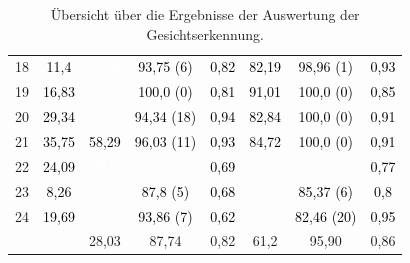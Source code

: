 \begin{table}[]
\begin{tabular}{c | c | c  c c | c c c}
18 & \cellcolor[HTML]{E2E2E2}\textcolor{black}{11,4} & \cellcolor[HTML]{BA4500}\textcolor{white}{27,08} & \cellcolor[HTML]{0FF000}\textcolor{black}{93,75 (6)} & \cellcolor[HTML]{2ED100}\textcolor{black}{0,82}& \cellcolor[HTML]{2DD200}\textcolor{black}{82,19} & \cellcolor[HTML]{01FD00}\textcolor{black}{98,96 (1)} & \cellcolor[HTML]{10EE00}\textcolor{black}{0,93} \\
19 & \cellcolor[HTML]{D3D3D3}\textcolor{black}{16,83} & \cellcolor[HTML]{916E00}\textcolor{white}{43,21} & \cellcolor[HTML]{00FF00}\textcolor{black}{100,0 (0)} & \cellcolor[HTML]{30CF00}\textcolor{black}{0,81}& \cellcolor[HTML]{17E800}\textcolor{black}{91,01} & \cellcolor[HTML]{00FF00}\textcolor{black}{100,0 (0)} & \cellcolor[HTML]{26D900}\textcolor{black}{0,85} \\
20 & \cellcolor[HTML]{B3B3B3}\textcolor{black}{29,34} & \cellcolor[HTML]{8C7300}\textcolor{white}{45,11} & \cellcolor[HTML]{0EF100}\textcolor{black}{94,34 (18)} & \cellcolor[HTML]{0FF000}\textcolor{black}{0,94}& \cellcolor[HTML]{2BD300}\textcolor{black}{82,84} & \cellcolor[HTML]{00FF00}\textcolor{black}{100,0 (0)} & \cellcolor[HTML]{17E800}\textcolor{black}{0,91} \\
21 & \cellcolor[HTML]{A3A3A3}\textcolor{black}{35,75} & \cellcolor[HTML]{699500}\textcolor{black}{58,29} & \cellcolor[HTML]{09F500}\textcolor{black}{96,03 (11)} & \cellcolor[HTML]{10EE00}\textcolor{black}{0,93}& \cellcolor[HTML]{27D800}\textcolor{black}{84,72} & \cellcolor[HTML]{00FF00}\textcolor{black}{100,0 (0)} & \cellcolor[HTML]{17E800}\textcolor{black}{0,91} \\
22 & \cellcolor[HTML]{C2C2C2}\textcolor{black}{24,09} & \cellcolor[HTML]{B54900}\textcolor{white}{29,0} & \cellcolor[HTML]{768900}\textcolor{white}{53,59 (71)} & \cellcolor[HTML]{4FB000}\textcolor{black}{0,69}& \cellcolor[HTML]{B54900}\textcolor{white}{29,16} & \cellcolor[HTML]{728C00}\textcolor{white}{54,9 (69)} & \cellcolor[HTML]{39C500}\textcolor{black}{0,77} \\
23 & \cellcolor[HTML]{EAEAEA}\textcolor{black}{8,26} & \cellcolor[HTML]{DD2200}\textcolor{white}{13,43} & \cellcolor[HTML]{1FE000}\textcolor{black}{87,8 (5)} & \cellcolor[HTML]{51AE00}\textcolor{black}{0,68}& \cellcolor[HTML]{E11E00}\textcolor{white}{11,78} & \cellcolor[HTML]{25DA00}\textcolor{black}{85,37 (6)} & \cellcolor[HTML]{32CC00}\textcolor{black}{0,8} \\
24 & \cellcolor[HTML]{CDCDCD}\textcolor{black}{19,69} & \cellcolor[HTML]{BB4400}\textcolor{white}{26,77} & \cellcolor[HTML]{0FF000}\textcolor{black}{93,86 (7)} & \cellcolor[HTML]{619E00}\textcolor{black}{0,62}& \cellcolor[HTML]{B94600}\textcolor{white}{27,63} & \cellcolor[HTML]{2CD300}\textcolor{black}{82,46 (20)} & \cellcolor[HTML]{0CF300}\textcolor{black}{0,95} \\

\hline
& & 28,03 & 87,74 & 0,82 & 61,2 & 95,90 & 0,86 \\
        \bottomrule
    \end{tabular}
    \caption{Übersicht über die Ergebnisse der Auswertung der Gesichtserkennung.}
    \label{tab:evaluation:face:scores}
\end{table}

